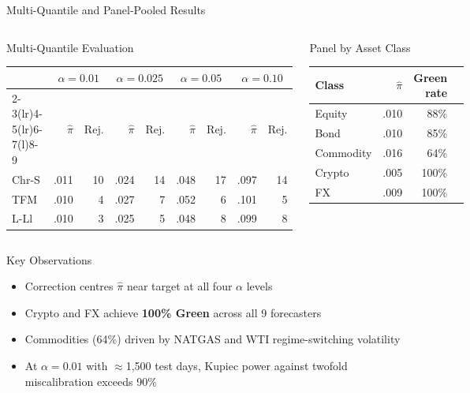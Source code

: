 \documentclass[9pt, aspectratio=169, t]{beamer}
\begin{document}
\begin{frame}{Multi-Quantile and Panel-Pooled Results}
	\vspace{-0.2cm}
	{\scriptsize
	\begin{columns}[T]
		\begin{block}{Multi-Quantile Evaluation}
		{\tiny
		\begin{tabular}{@{}l rr rr rr rr@{}}
		\toprule
		& \multicolumn{2}{c}{$\alpha=0.01$} & \multicolumn{2}{c}{$\alpha=0.025$} & \multicolumn{2}{c}{$\alpha=0.05$} & \multicolumn{2}{c}{$\alpha=0.10$} \\
		\cmidrule(lr){2-3}\cmidrule(lr){4-5}\cmidrule(lr){6-7}\cmidrule(l){8-9}
		& $\hat\pi$ & Rej. & $\hat\pi$ & Rej. & $\hat\pi$ & Rej. & $\hat\pi$ & Rej. \\
		\midrule
		Chr-S  & .011 & 10 & .024 & 14 & .048 & 17 & .097 & 14 \\
		TFM    & .010 &  4 & .027 &  7 & .052 &  6 & .101 &  5 \\
		L-Ll   & .010 &  3 & .025 &  5 & .048 &  8 & .099 &  8 \\
		\bottomrule
		\end{tabular}
		}
		\end{block}

		\begin{block}{Panel by Asset Class}
		\begin{tabular}{@{}lrrr@{}}
		\toprule
		Class & $\hat\pi$ & Green rate \\
		\midrule
		Equity     & .010 & 88\% \\
		Bond       & .010 & 85\% \\
		Commodity  & .016 & 64\% \\
		Crypto     & .005 & 100\% \\
		FX         & .009 & 100\% \\
		\bottomrule
		\end{tabular}
		\end{block}
	\end{columns}
	}
	\vspace{2mm}
	{\footnotesize
	\begin{block}{Key Observations}
		\begin{itemize}\setlength{\itemsep}{1pt}
			\item Correction centres $\hat\pi$ near target at all four $\alpha$ levels
			\item Crypto and FX achieve \textbf{100\% Green} across all 9 forecasters
			\item Commodities (64\%) driven by NATGAS and WTI regime-switching volatility
			\item At $\alpha = 0.01$ with $\approx$1{,}500 test days, Kupiec power against twofold miscalibration exceeds 90\%
		\end{itemize}
	\end{block}
	}
\end{frame}
\end{document}
